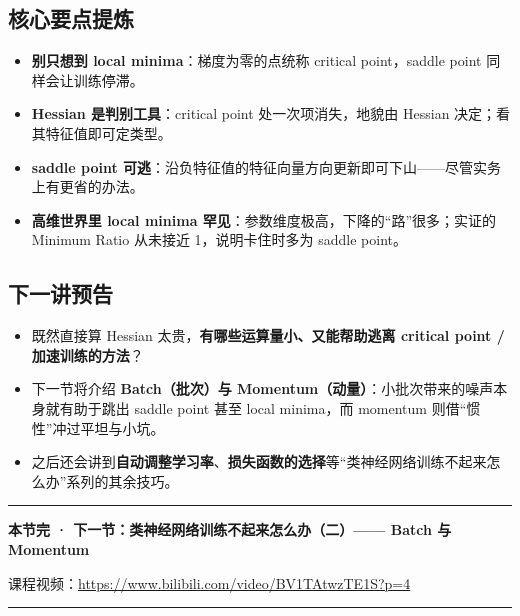 \documentclass[a4paper]{article}
\newcommand{\videourl}{https://www.bilibili.com/video/BV1TAtwzTE1S?p=4}
\begin{document}
\subsection{核心要点提炼}

\begin{itemize}
    \item \textbf{别只想到 local minima}：梯度为零的点统称 critical point，saddle point 同样会让训练停滞。
    \item \textbf{Hessian 是判别工具}：critical point 处一次项消失，地貌由 Hessian 决定；看其特征值即可定类型。
    \item \textbf{saddle point 可逃}：沿负特征值的特征向量方向更新即可下山——尽管实务上有更省的办法。
    \item \textbf{高维世界里 local minima 罕见}：参数维度极高，下降的``路''很多；实证的 Minimum Ratio 从未接近 1，说明卡住时多为 saddle point。
\end{itemize}

\subsection{下一讲预告}

\begin{itemize}
    \item 既然直接算 Hessian 太贵，\textbf{有哪些运算量小、又能帮助逃离 critical point / 加速训练的方法}？
    \item 下一节将介绍 \textbf{Batch（批次）与 Momentum（动量）}：小批次带来的噪声本身就有助于跳出 saddle point 甚至 local minima，而 momentum 则借``惯性''冲过平坦与小坑。
    \item 之后还会讲到\textbf{自动调整学习率}、\textbf{损失函数的选择}等``类神经网络训练不起来怎么办''系列的其余技巧。
\end{itemize}

\vspace{1cm}

\begin{center}
    \rule{0.5\textwidth}{0.5pt}
    \vspace{0.3cm}

    \textbf{本节完 · 下一节：类神经网络训练不起来怎么办（二）—— Batch 与 Momentum}

    课程视频：\href{\videourl}{\videourl}

    \vspace{0.3cm}
    \rule{0.5\textwidth}{0.5pt}
\end{center}
\end{document}
